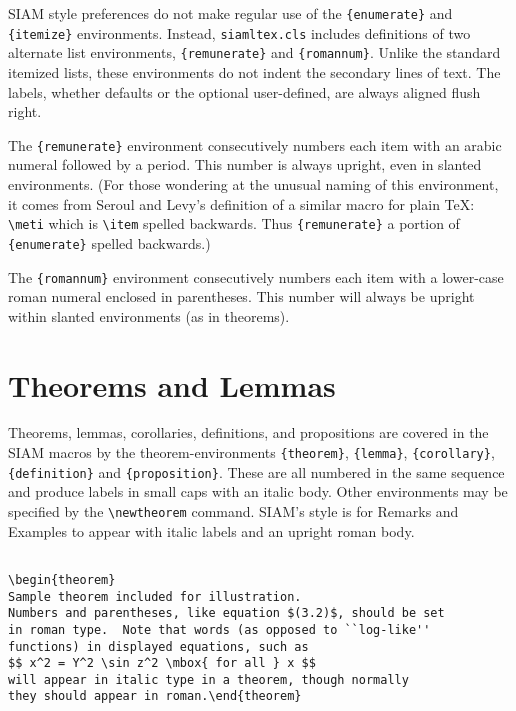 \documentclass[final,leqno,onefignum,onetabnum]{siamltex1213}
\begin{document}
SIAM style preferences do not make regular use of the \verb|{enumerate}|
and \verb|{itemize}| environments. Instead,
{\tt siamltex.cls} includes definitions of two alternate list
environments, \verb|{remunerate}| and \verb|{romannum}|.
Unlike the standard itemized lists, these environments do
not indent the secondary lines of text. The labels, whether
defaults or the optional user-defined, are always aligned
flush right.

The \verb|{remunerate}| environment consecutively numbers
each item with an arabic numeral followed by a period. This
number is always upright, even in slanted
environments. (For those wondering at the unusual
naming of this environment, it comes from Seroul and Levy's
\cite{SerLev} definition of a similar macro for plain \TeX: 
\verb|\meti| which is
\protect\verb|\item|  spelled backwards. Thus
\verb|{remunerate}|
a portion of 
\verb|{enumerate}|
spelled backwards.)

The \verb|{romannum}| environment consecutively numbers
each item with a lower-case roman numeral enclosed in
parentheses. This number will always be upright within
slanted environments (as in theorems).


\section{Theorems and Lemmas}
Theorems, lemmas, corollaries, definitions, and propositions are covered
in the SIAM macros by the theorem-environments
\verb|{theorem}|, \verb|{lemma}|, \verb|{corollary}|,
\verb|{definition}| and \verb|{proposition}|. These are all
numbered in the same sequence and produce labels in small 
caps with an italic body. Other environments may be specified by the
\verb|\newtheorem| command. SIAM's style is for Remarks and Examples
to appear with italic labels and an upright roman body.

\begin{verbatim}

\begin{theorem}
Sample theorem included for illustration.  
Numbers and parentheses, like equation $(3.2)$, should be set 
in roman type.  Note that words (as opposed to ``log-like''
functions) in displayed equations, such as
$$ x^2 = Y^2 \sin z^2 \mbox{ for all } x $$
will appear in italic type in a theorem, though normally
they should appear in roman.\end{theorem}

\end{verbatim}
\end{document}

